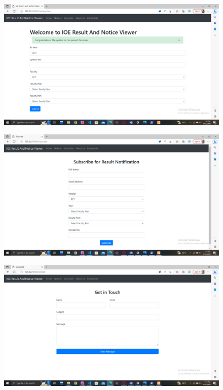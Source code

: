 \begin{figure}[h]
    \centering
    \includegraphics[scale=0.2]{pictures/2.png}
\end{figure}

\begin{figure}[h]
    \centering
    \includegraphics[scale=0.2]{pictures/3.png}
\end{figure}

\begin{figure}[h]
    \centering
    \includegraphics[scale=0.2]{pictures/4.png}
\end{figure}

